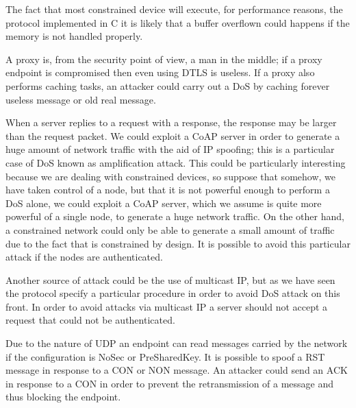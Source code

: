 	The fact that most constrained device will execute, for performance reasons, the protocol implemented in C it is likely that a buffer overflown could happens if the memory is not handled properly. \newline
	
	A proxy is, from the security point of view, a man in the middle; if a proxy endpoint is compromised then even using DTLS is useless.\newline
	If a proxy also performs caching tasks, an attacker could carry out a DoS by caching forever useless message or old real message.\newline
	
	When a server replies to a request with a response, the response may be larger than the request packet.\newline
	We could exploit a CoAP server in order to generate a huge amount of network traffic with the aid of IP spoofing; this is a particular case of DoS known as amplification attack.\newline
	This could be particularly interesting because we are dealing with constrained devices, so suppose that somehow, we have taken control of a node, but that it is not powerful enough to perform a DoS alone, we could exploit a CoAP server, which we assume is quite more powerful of a single node, to generate a huge network traffic.\newline
	On the other hand, a constrained network could only be able to generate a small amount of traffic due to the fact that is constrained by design.\newline
	It is possible to avoid this particular attack if the nodes are authenticated.\newline
	
	Another source of attack could be the use of multicast IP, but as we have seen the protocol specify a particular procedure in order to avoid DoS attack on this front.\newline
	In order to avoid attacks via multicast IP a server should not accept a request that could not be authenticated.
	
	Due to the nature of UDP an endpoint can read messages carried by the network if the configuration is NoSec or PreSharedKey.\newline
	It is possible to spoof a RST message in response to a CON or NON message.
	An attacker could send an ACK in response to a CON in order to prevent the retransmission of a message and thus blocking the endpoint.\newline
	

